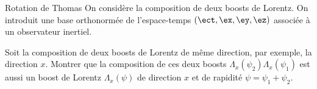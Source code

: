   \begin{exo}[PC][3][TD]{Rotation de Thomas}
    On considère la composition de deux boosts de Lorentz. On introduit une base orthonormée de l'espace-temps $(\ect,\ex,\ey,\ez)$ associée à un observateur inertiel.
    \begin{quest}
      \item	Soit la composition de deux boosts de Lorentz de même direction, par exemple, la direction $x$. Montrer que la composition de ces deux boosts $ \Lambda_x(\psi_2)\Lambda_x(\psi_1)$ est aussi un boost de Lorentz $\Lambda_x(\psi)$ de direction $x$ et de rapidité $\psi = \psi_1 + \psi_2$.
        

\end{quest}
\end{exo}
